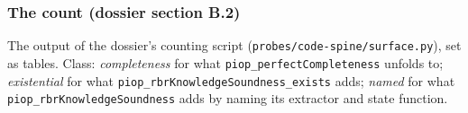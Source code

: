 \subsubsection{The count (dossier section B.2)}\label{sec:gen-spine-B2}

The output of the dossier's counting script (\texttt{probes/\allowbreak{}code-{}spine/\allowbreak{}surface.\allowbreak{}py}), set as tables. Class: \emph{completeness} for what \texttt{piop\_\allowbreak{}perfectCompleteness} unfolds to; \emph{existential} for what \texttt{p\allowbreak{}i\allowbreak{}o\allowbreak{}p\allowbreak{}\_\allowbreak{}r\allowbreak{}b\allowbreak{}r\allowbreak{}K\allowbreak{}n\allowbreak{}o\allowbreak{}w\allowbreak{}l\allowbreak{}e\allowbreak{}d\allowbreak{}g\allowbreak{}e\allowbreak{}S\allowbreak{}o\allowbreak{}u\allowbreak{}n\allowbreak{}d\allowbreak{}n\allowbreak{}e\allowbreak{}s\allowbreak{}s\allowbreak{}\_\allowbreak{}e\allowbreak{}x\allowbreak{}i\allowbreak{}s\allowbreak{}t\allowbreak{}s} adds; \emph{named} for what \texttt{piop\_\allowbreak{}rbrKnowledgeSoundness} adds by naming its extractor and state function.

